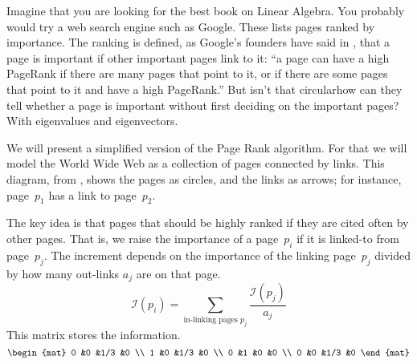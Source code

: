 
Imagine that you are looking for the best book
on Linear Algebra.
You probably would try a web search engine such as Google.
These lists pages ranked by importance.
The ranking is defined, as Google's founders have said in \cite{BrinPage}, 
that a page is important if other important
pages link to it:
``a page can have a high PageRank if there are many pages that point
to it, or if there are some pages that point to it and have a high PageRank.''
But isn't that circular\Dash how can they tell whether a page is
important without first deciding on the important pages?
With eigenvalues and eigenvectors.

We will present a simplified version of the Page Rank algorithm. 
For that we will model the World Wide Web as a collection of pages connected by
links.
This diagram, from \cite{Wills},
shows the pages as circles, and the links as arrows;
for instance, page~$p_1$ has a link to page~$p_2$. 
\begin{center}  %
  \shortstack{\rule{0em}{1.5ex} \\ \texttt{[image: ch5.9]} \\ \rule{0em}{1.5ex}}
\end{center}

The key idea is that pages that should be highly ranked if they are
cited often by other pages.
That is, we raise the importance of a page~$p_i$
if it is linked-to from page~$p_j$.
The increment depends on the importance of the linking page~$p_j$
divided by how many out-links $a_j$ are on that page.
\begin{equation*}
  \mathcal{I}(p_i)=\sum_{\text{in-linking pages $p_j$}}  \frac{\mathcal{I}(p_j)}{a_j}
\end{equation*}
This matrix stores the information.
\begin{equation*}
  \begin{mat}
    0   &0  &1/3  &0   \\
    1   &0  &1/3  &0   \\
    0   &1  &0    &0 \\
    0   &0  &1/3  &0
  \end{mat}
\end{equation*}

